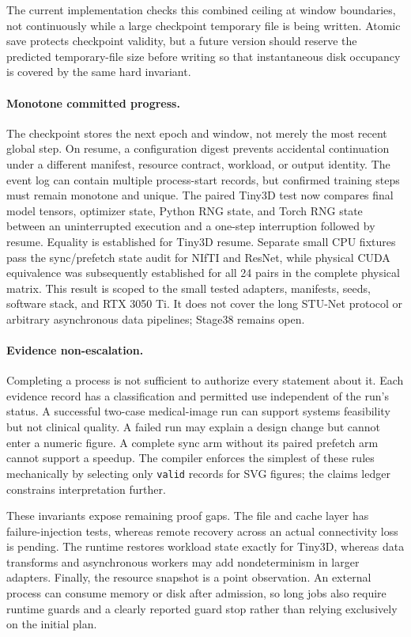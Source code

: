 The current implementation checks this combined ceiling at window boundaries,
not continuously while a large checkpoint temporary file is being written.
Atomic save protects checkpoint validity, but a future version should reserve
the predicted temporary-file size before writing so that instantaneous disk
occupancy is covered by the same hard invariant.

\paragraph{Monotone committed progress.}
The checkpoint stores the next epoch and window, not merely the most recent
global step. On resume, a configuration digest prevents accidental continuation
under a different manifest, resource contract, workload, or output identity.
The event log can contain multiple process-start records, but confirmed training
steps must remain monotone and unique. The paired Tiny3D test now compares final
model tensors, optimizer state, Python RNG state, and Torch RNG state between an
uninterrupted execution and a one-step interruption followed by resume. Equality is established for Tiny3D resume. Separate small CPU fixtures pass the
sync/prefetch state audit for NIfTI and ResNet, while physical CUDA equivalence
was subsequently established for all 24 pairs in the complete physical matrix.
This result is scoped to the small tested adapters, manifests, seeds, software
stack, and RTX 3050 Ti. It does not cover the long STU-Net protocol or arbitrary
asynchronous data pipelines; Stage38 remains open.

\paragraph{Evidence non-escalation.}
Completing a process is not sufficient to authorize every statement about it.
Each evidence record has a classification and permitted use independent of the
run's status. A successful two-case medical-image run can support systems
feasibility but not clinical quality. A failed run may explain a design change
but cannot enter a numeric figure. A complete sync arm without its paired
prefetch arm cannot support a speedup. The compiler enforces the simplest of
these rules mechanically by selecting only \texttt{valid} records for SVG
figures; the claims ledger constrains interpretation further.

These invariants expose remaining proof gaps. The file and cache layer has
failure-injection tests, whereas remote recovery across an actual connectivity
loss is pending. The runtime restores workload state exactly for Tiny3D, whereas
data transforms and asynchronous workers may add nondeterminism in larger
adapters. Finally, the resource snapshot is a point observation. An external
process can consume memory or disk after admission, so long jobs also require
runtime guards and a clearly reported guard stop rather than relying exclusively
on the initial plan.
